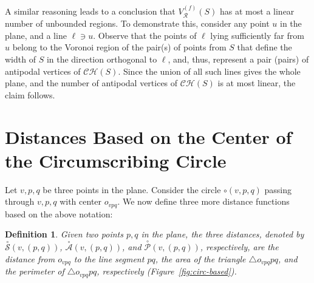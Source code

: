 \documentclass[10pt, conference, compsocconf]{IEEEtran}
\newtheorem{definition}{Definition}
\def\R{{\mathcal R}}
\def\XA{{\stackrel{\circ}{\mathcal A}}}
\def\XP{{\stackrel{\circ}{\mathcal P}}}
\def\XS{{\stackrel{\circ}{\mathcal S}}}
\begin{document}
A similar reasoning leads to a conclusion that $V_{\R}^{(f)}(S)$ has at
most a linear number of unbounded regions.  To demonstrate this, consider
any point $u$ in the plane, and a line $\ell \ni u$.  Observe that the
points of $\ell$ lying sufficiently far from $u$ belong to the Voronoi
region of the pair(s) of points from $S$ that define the width of $S$ in
the direction orthogonal to $\ell$, and, thus, represent a pair (pairs)
of antipodal vertices of $\mathcal{CH}(S)$.  Since the union of all such
lines gives the whole plane, and the number of antipodal vertices of
$\mathcal{CH}(S)$ is at most linear, the claim follows.



\section{Distances Based on the Center of the Circumscribing Circle}

Let $v,p,q$ be three points in the plane. Consider the circle $\circ(v,p,q)$
passing through $v,p,q$ with center $o_{vpq}$.
We now define three more distance functions based on the above notation:
\begin{definition}
   Given two points $p,q$ in the plane, the three distances, denoted by
   $\XS(v,(p,q))$, $\XA(v,(p,q))$, and $\XP(v,(p,q))$, respectively, are
   the distance from $o_{vpq}$ to the line segment $pq$, the area of the
   triangle $\triangle o_{vpq}pq$, and the perimeter of
   $\triangle o_{vpq}pq$, respectively (Figure~\ref{fig:circ-based}).
\end{definition}
\end{document}
